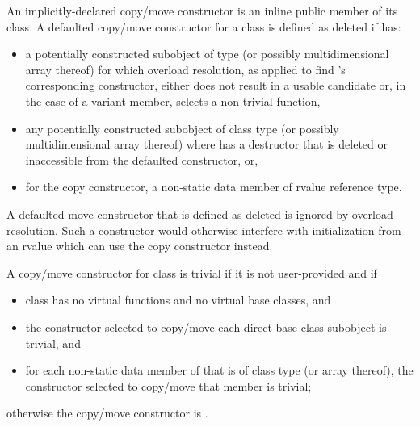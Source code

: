 \pnum
An implicitly-declared copy/move constructor is an
inline public member of its class.
A defaulted copy/\brk{}move constructor for a class
   is defined as deleted if  has:
\begin{itemize}
\item a potentially constructed subobject of type
   (or possibly multidimensional array thereof) for which
  overload resolution, as applied to find
  's corresponding constructor,
  either does not result in a usable candidate or,
  in the case of a variant member, selects a non-trivial function,

\item any potentially constructed subobject of
  class type  (or possibly multidimensional array thereof)
  where  has
  a destructor that is deleted or inaccessible from the defaulted
  constructor, or,

\item for the copy constructor, a non-static data member of rvalue reference type.
\end{itemize}

\begin{note}
A defaulted move constructor that is defined as deleted is ignored by overload
resolution.
Such a constructor would otherwise interfere with initialization from
an rvalue which can use the copy constructor instead.
\end{note}

\pnum
{}%
%
A copy/move constructor for class
is
trivial
if it is not user-provided and if
\begin{itemize}
\item
class
has no virtual functions
and no virtual base classes, and

\item
the constructor selected to copy/move each direct base class subobject is trivial, and

\item
for each non-static data member of
that is of class type (or array thereof),
the constructor selected to copy/move that member is trivial;
\end{itemize}

%
otherwise the copy/move constructor is
.

